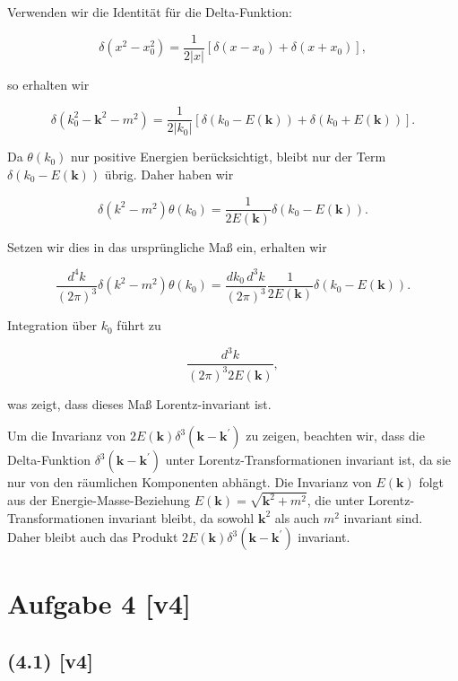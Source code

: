 \documentclass[11pt,a4paper]{article}
\begin{document}
Verwenden wir die Identität für die Delta-Funktion:

\[
\delta\left(x^2 - x_0^2\right) = \frac{1}{2|x|}\left[\delta\left(x - x_0\right) + \delta\left(x + x_0\right)\right],
\]

so erhalten wir

\[
\delta\left(k_0^2 - \mathbf{k}^2 - m^2\right) = \frac{1}{2|k_0|} \left[\delta\left(k_0 - E(\mathbf{k})\right) + \delta\left(k_0 + E(\mathbf{k})\right)\right].
\]

Da $\theta(k_0)$ nur positive Energien berücksichtigt, bleibt nur der Term $\delta\left(k_0 - E(\mathbf{k})\right)$ übrig. Daher haben wir

\[
\delta\left(k^2 - m^2\right) \theta\left(k_0\right) = \frac{1}{2E(\mathbf{k})} \delta\left(k_0 - E(\mathbf{k})\right).
\]

Setzen wir dies in das ursprüngliche Maß ein, erhalten wir

\[
\frac{d^4 k}{(2 \pi)^3} \delta\left(k^2 - m^2\right) \theta\left(k_0\right) = \frac{dk_0 \, d^3 k}{(2 \pi)^3} \frac{1}{2E(\mathbf{k})} \delta\left(k_0 - E(\mathbf{k})\right).
\]

Integration über $k_0$ führt zu

\[
\frac{d^3 k}{(2 \pi)^3 2E(\mathbf{k})},
\]

was zeigt, dass dieses Maß Lorentz-invariant ist.

Um die Invarianz von $2 E(\mathbf{k}) \delta^3\left(\mathbf{k} - \mathbf{k}^{\prime}\right)$ zu zeigen, beachten wir, dass die Delta-Funktion $\delta^3\left(\mathbf{k} - \mathbf{k}^{\prime}\right)$ unter Lorentz-Transformationen invariant ist, da sie nur von den räumlichen Komponenten abhängt. Die Invarianz von $E(\mathbf{k})$ folgt aus der Energie-Masse-Beziehung $E(\mathbf{k}) = \sqrt{\mathbf{k}^2 + m^2}$, die unter Lorentz-Transformationen invariant bleibt, da sowohl $\mathbf{k}^2$ als auch $m^2$ invariant sind. Daher bleibt auch das Produkt $2 E(\mathbf{k}) \delta^3\left(\mathbf{k} - \mathbf{k}^{\prime}\right)$ invariant.


\section*{Aufgabe 4 [v4]}
\subsection*{(4.1) [v4]}
\end{document}

